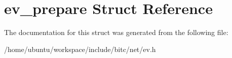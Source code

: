 \hypertarget{structev__prepare}{\section{ev\-\_\-prepare Struct Reference}
\label{structev__prepare}
}


The documentation for this struct was generated from the following file\-:\begin{DoxyCompactItemize}
\item 
/home/ubuntu/workspace/include/bitc/net/ev.\-h\end{DoxyCompactItemize}
